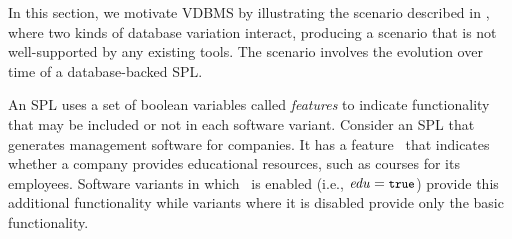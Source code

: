 


In this section, we motivate VDBMS by illustrating the scenario described in
, where two kinds of database variation interact, producing a
scenario that is not well-supported by any existing tools. The scenario
involves the evolution over time of a database-backed SPL.


An SPL uses a set of boolean variables called \emph{features} 
to indicate functionality that may be included or not in each software
variant.
Consider an SPL that generates management software for companies. 
It has a feature \edu\ that 
indicates whether a company
provides educational resources, such as courses for its 
employees.
Software variants in which \edu\ is enabled (i.e., $\edu=\t$) provide this
additional functionality while variants where it is disabled provide only the
basic functionality.


